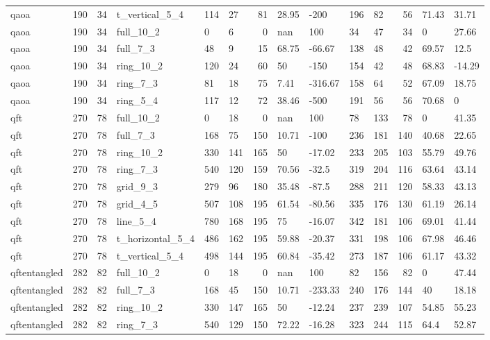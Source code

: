 \begin{longtable}{lrrlllrllllrll}
qaoa & 190 & 34 & t\_vertical\_5\_4 & 114 & 27 & 81 & 28.95 & -200 & 196 & 82 & 56 & 71.43 & 31.71 \\
qaoa & 190 & 34 & full\_10\_2 & 0 & 6 & 0 & nan & 100 & 34 & 47 & 34 & 0 & 27.66 \\
qaoa & 190 & 34 & full\_7\_3 & 48 & 9 & 15 & 68.75 & -66.67 & 138 & 48 & 42 & 69.57 & 12.5 \\
qaoa & 190 & 34 & ring\_10\_2 & 120 & 24 & 60 & 50 & -150 & 154 & 42 & 48 & 68.83 & -14.29 \\
qaoa & 190 & 34 & ring\_7\_3 & 81 & 18 & 75 & 7.41 & -316.67 & 158 & 64 & 52 & 67.09 & 18.75 \\
qaoa & 190 & 34 & ring\_5\_4 & 117 & 12 & 72 & 38.46 & -500 & 191 & 56 & 56 & 70.68 & 0 \\
qft & 270 & 78 & full\_10\_2 & 0 & 18 & 0 & nan & 100 & 78 & 133 & 78 & 0 & 41.35 \\
qft & 270 & 78 & full\_7\_3 & 168 & 75 & 150 & 10.71 & -100 & 236 & 181 & 140 & 40.68 & 22.65 \\
qft & 270 & 78 & ring\_10\_2 & 330 & 141 & 165 & 50 & -17.02 & 233 & 205 & 103 & 55.79 & 49.76 \\
qft & 270 & 78 & ring\_7\_3 & 540 & 120 & 159 & 70.56 & -32.5 & 319 & 204 & 116 & 63.64 & 43.14 \\
qft & 270 & 78 & grid\_9\_3 & 279 & 96 & 180 & 35.48 & -87.5 & 288 & 211 & 120 & 58.33 & 43.13 \\
qft & 270 & 78 & grid\_4\_5 & 507 & 108 & 195 & 61.54 & -80.56 & 335 & 176 & 130 & 61.19 & 26.14 \\
qft & 270 & 78 & line\_5\_4 & 780 & 168 & 195 & 75 & -16.07 & 342 & 181 & 106 & 69.01 & 41.44 \\
qft & 270 & 78 & t\_horizontal\_5\_4 & 486 & 162 & 195 & 59.88 & -20.37 & 331 & 198 & 106 & 67.98 & 46.46 \\
qft & 270 & 78 & t\_vertical\_5\_4 & 498 & 144 & 195 & 60.84 & -35.42 & 273 & 187 & 106 & 61.17 & 43.32 \\
qftentangled & 282 & 82 & full\_10\_2 & 0 & 18 & 0 & nan & 100 & 82 & 156 & 82 & 0 & 47.44 \\
qftentangled & 282 & 82 & full\_7\_3 & 168 & 45 & 150 & 10.71 & -233.33 & 240 & 176 & 144 & 40 & 18.18 \\
qftentangled & 282 & 82 & ring\_10\_2 & 330 & 147 & 165 & 50 & -12.24 & 237 & 239 & 107 & 54.85 & 55.23 \\
qftentangled & 282 & 82 & ring\_7\_3 & 540 & 129 & 150 & 72.22 & -16.28 & 323 & 244 & 115 & 64.4 & 52.87 \\

\end{longtable}
